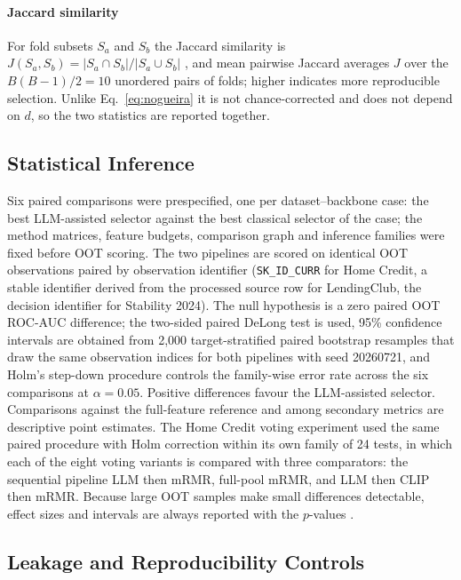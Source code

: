 \documentclass[final,5p,twocolumn]{elsarticle}
\begin{document}
\paragraph{Jaccard similarity}
For fold subsets $S_a$ and $S_b$ the Jaccard similarity is $J(S_a,S_b)=|S_a\cap S_b|/|S_a\cup S_b|$ \cite{jaccard1901}, and mean pairwise Jaccard averages $J$ over the $B(B-1)/2=10$ unordered pairs of folds; higher indicates more reproducible selection. Unlike Eq.~\eqref{eq:nogueira} it is not chance-corrected and does not depend on $d$, so the two statistics are reported together.

\subsection{Statistical Inference}
\label{subsec:inference}

Six paired comparisons were prespecified, one per dataset--backbone case: the best LLM-assisted selector against the best classical selector of the case; the method matrices, feature budgets, comparison graph and inference families were fixed before OOT scoring. The two pipelines are scored on identical OOT observations paired by observation identifier (\texttt{SK\_ID\_CURR} for Home Credit, a stable identifier derived from the processed source row for LendingClub, the decision identifier for Stability 2024). The null hypothesis is a zero paired OOT ROC-AUC difference; the two-sided paired DeLong test \cite{delong1988} is used, 95\% confidence intervals are obtained from 2,000 target-stratified paired bootstrap resamples that draw the same observation indices for both pipelines \cite{efron1993} with seed 20260721, and Holm's step-down procedure \cite{holm1979} controls the family-wise error rate across the six comparisons at $\alpha=0.05$. Positive differences favour the LLM-assisted selector. Comparisons against the full-feature reference and among secondary metrics are descriptive point estimates. The Home Credit voting experiment used the same paired procedure with Holm correction within its own family of 24 tests, in which each of the eight voting variants is compared with three comparators: the sequential pipeline LLM then mRMR, full-pool mRMR, and LLM then CLIP then mRMR. Because large OOT samples make small differences detectable, effect sizes and intervals are always reported with the $p$-values \cite{demsar2006}.

\subsection{Leakage and Reproducibility Controls}
\label{subsec:leakage_controls}
\end{document}
